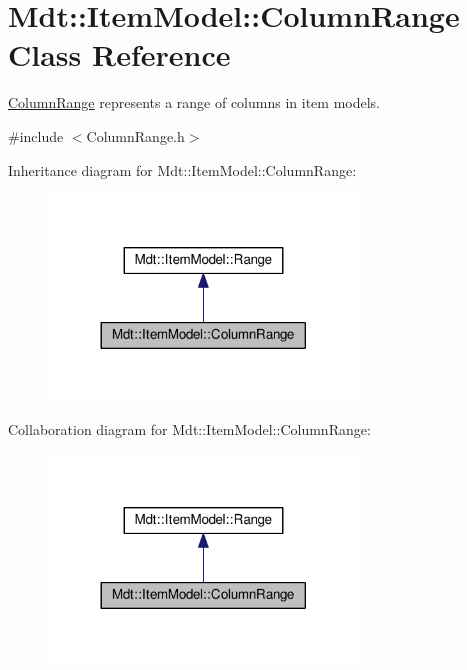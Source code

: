 \hypertarget{class_mdt_1_1_item_model_1_1_column_range}{}\section{Mdt\+:\+:Item\+Model\+:\+:Column\+Range Class Reference}
\label{class_mdt_1_1_item_model_1_1_column_range}


\hyperlink{class_mdt_1_1_item_model_1_1_column_range}{Column\+Range} represents a range of columns in item models.  




{\ttfamily \#include $<$Column\+Range.\+h$>$}



Inheritance diagram for Mdt\+:\+:Item\+Model\+:\+:Column\+Range\+:\nopagebreak
\begin{figure}[H]
\begin{center}
\leavevmode
\includegraphics[width=233pt]{class_mdt_1_1_item_model_1_1_column_range__inherit__graph}
\end{center}
\end{figure}


Collaboration diagram for Mdt\+:\+:Item\+Model\+:\+:Column\+Range\+:\nopagebreak
\begin{figure}[H]
\begin{center}
\leavevmode
\includegraphics[width=233pt]{class_mdt_1_1_item_model_1_1_column_range__coll__graph}
\end{center}
\end{figure}
